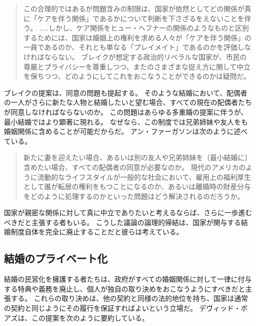 \documentclass[paper=a4,book,openany]{jlreq}
\newcommand{\ig}[1]{}           %
\begin{document}
\begin{quote}
この合理的ではあるが問題含みの制限は、国家が依然としてどの関係が真に「ケアを伴う関係」であるかについて判断を下さざるをえないことを伴う。
……しかし、ケア関係をヒュー・ヘフナーの関係のようなものと区別するためには、国家は婚姻上の権利を求める人々が「ケアを伴う関係」の一員であるのか、それとも単なる「プレイメイト」であるのかを評価しなければならない。
ブレイクが想定する政治的リベラルな国家が、市民の尊厳とプライバシーを尊重しつつ、またのさまざまな捉え方に関して中立を保ちつつ、どのようにしてこれをおこなうことができるのかは疑問だ。
\citep[p.96]{chambers17:againstmarriage}\ig{Clare chmbers}
\end{quote}

ブレイクの提案は、同意の問題も提起する。
そのような結婚において、配偶者の一人がさらに新たな人物と結婚したいと望む場合、すべての現在の配偶者たちが同意しなければならないのか。
この問題はあらゆる多重婚の提案に伴うが、最小結婚ではより顕著に現れる。
なぜなら、この制度では兄弟姉妹や友人をも婚姻関係に含めることが可能だからだ。
アン・ファーガソンは次のように述べている。

\begin{quote}
新たに妻を迎えたい場合、あるいは別の友人や兄弟姉妹を〔最小結婚に〕含めたい場合、すべての配偶者の同意が必要なのか。
現代のアメリカのように流動的なライフスタイルが一般的な社会において、雇用上の福利厚生として誰が転居の権利をもつことになるのか、あるいは離婚時の財産分与をどのように処理するのかといった問題はどう解決されるのだろうか。
\citep{ferguson14:_review_brake}
\end{quote}

国家が親密な関係に対して真に中立でありたいと考えるならば、さらに一歩進むべきだと主張する者もいる。
こうした議論の論理的帰結は、国家が関与する結婚制度自体を完全に廃止することだと彼らは考えている。

\subsection{結婚のプライベート化}

結婚の民営化を擁護する者たちは、政府がすべての婚姻関係に対して一律に付与する特典や義務を廃止し、個人が独自の取り決めをおこなうようにすべきだと主張する。
これらの取り決めは、他の契約と同様の法的地位を持ち、国家は通常の契約と同じようにその履行を保証すればよいという立場だ。
デヴィッド・ボアズは、この提案を次のように要約している。
\end{document}
